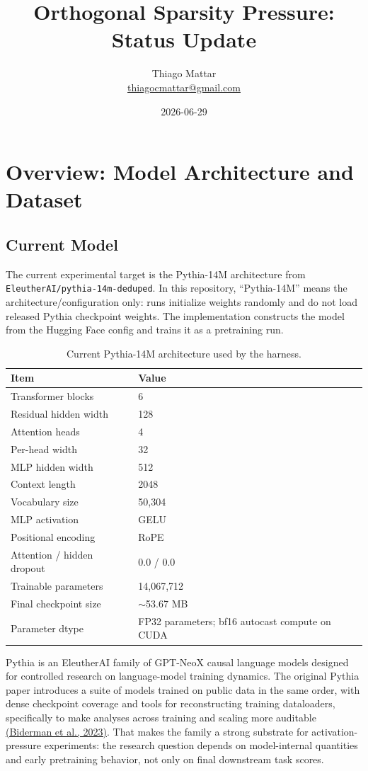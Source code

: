 \documentclass[10pt]{article}
\title{Orthogonal Sparsity Pressure: Status Update}
\author{Thiago Mattar\\\href{mailto:thiagocmattar@gmail.com}{thiagocmattar@gmail.com}}
\date{2026-06-29}
\newcommand{\code}[1]{\texttt{#1}}
\newcommand{\tightsection}[1]{\section{#1}\vspace{-0.35em}}
\begin{document}
\maketitle

\tightsection{Overview: Model Architecture and Dataset}

\subsection*{Current Model}

The current experimental target is the Pythia-14M architecture from \code{EleutherAI/pythia-14m-deduped}. In this repository, ``Pythia-14M'' means the architecture/configuration only: runs initialize weights randomly and do not load released Pythia checkpoint weights. The implementation constructs the model from the Hugging Face config and trains it as a pretraining run.

\begin{table}[H]
\centering
\caption{Current Pythia-14M architecture used by the harness.}
\begin{tabular}{ll}
\toprule
Item & Value \\
\midrule
Transformer blocks & 6 \\
Residual hidden width & 128 \\
Attention heads & 4 \\
Per-head width & 32 \\
MLP hidden width & 512 \\
Context length & 2048 \\
Vocabulary size & 50,304 \\
MLP activation & GELU \\
Positional encoding & RoPE \\
Attention / hidden dropout & 0.0 / 0.0 \\
Trainable parameters & 14,067,712 \\
Final checkpoint size & $\sim$53.67 MB \\
Parameter dtype & FP32 parameters; bf16 autocast compute on CUDA \\
\bottomrule
\end{tabular}
\end{table}

Pythia is an EleutherAI family of GPT-NeoX causal language models designed for controlled research on language-model training dynamics. The original Pythia paper introduces a suite of models trained on public data in the same order, with dense checkpoint coverage and tools for reconstructing training dataloaders, specifically to make analyses across training and scaling more auditable \href{https://arxiv.org/abs/2304.01373}{(Biderman et al., 2023)}. That makes the family a strong substrate for activation-pressure experiments: the research question depends on model-internal quantities and early pretraining behavior, not only on final downstream task scores.
\end{document}
